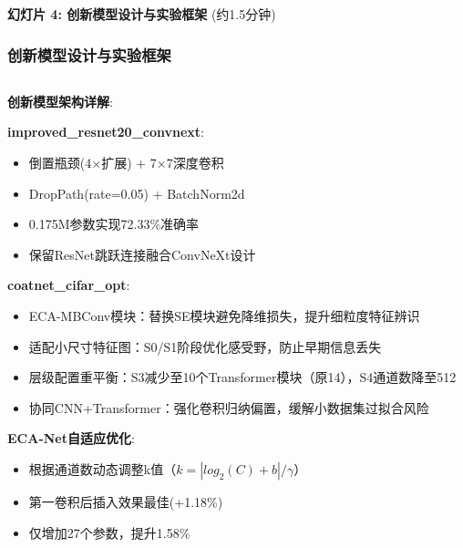 \documentclass[10pt]{beamer}
\begin{document}
\begin{frame}{\textbf{幻灯片 4: 创新模型设计与实验框架} (约1.5分钟)}
\frametitle{创新模型设计与实验框架}

{\scriptsize
\begin{columns}[T]
    \begin{column}{0.48\textwidth}
        \textbf{创新模型架构详解}:
        
            \textbf{improved\_resnet20\_convnext}:
            \begin{itemize}
                \item 倒置瓶颈(4×扩展) + 7×7深度卷积
                \item DropPath(rate=0.05) + BatchNorm2d
                \item 0.175M参数实现72.33\%准确率
                \item 保留ResNet跳跃连接融合ConvNeXt设计
            \end{itemize}
            \textbf{coatnet\_cifar\_opt}:
            \begin{itemize}
                \item ECA-MBConv模块：替换SE模块避免降维损失，提升细粒度特征辨识
                \item 适配小尺寸特征图：S0/S1阶段优化感受野，防止早期信息丢失
                \item 层级配置重平衡：S3减少至10个Transformer模块（原14），S4通道数降至512
                \item 协同CNN+Transformer：强化卷积归纳偏置，缓解小数据集过拟合风险
            \end{itemize}
            \textbf{ECA-Net自适应优化}:
            \begin{itemize}
                \item 根据通道数动态调整k值（$k = |log_2(C) + b|/\gamma$）
                \item 第一卷积后插入效果最佳(+1.18\%)
                \item 仅增加27个参数，提升1.58\%
            \end{itemize}
        

\end{column}
\end{columns}}
\end{frame}
\end{document}
